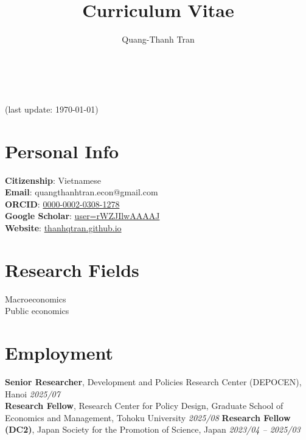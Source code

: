 \documentclass[12pt]{article}
\newcommand{\cvcolor}{\color{DodgerBlue4}} %
\renewcommand{\maketitle}{
\begin{center}
{\Huge\theauthor}\\
\vspace{0.5em}
{\Large \cvcolor{Curriculum Vitae}}\\
{\color{Gray}(last update: \today)}
\end{center}
}
\begin{document}
\title{Curriculum Vitae} %
\author{Quang-Thanh Tran}

\maketitle


\section{Personal Info}
\textbf{Citizenship}: Vietnamese \\
\textbf{Email}: quangthanhtran.econ@gmail.com \\
\textbf{ORCID}: \href{https://orcid.org/0000-0002-0308-1278}{0000-0002-0308-1278}\\
\textbf{Google Scholar}: \href{https://scholar.google.com/citations?user=rWZJIlwAAAAJ&hl=en}{user=rWZJIlwAAAAJ}\\
\textbf{Website}: \href{https://thanhqtran.github.io}{thanhqtran.github.io} \\


\section{Research Fields}
Macroeconomics \\
Public economics


\section{Employment}

\textbf{Senior Researcher}, Development and Policies Research Center (DEPOCEN), Hanoi \hfill \emph{2025/07} \\
\textbf{Research Fellow}, Research Center for Policy Design, Graduate School of Economics and Management, Tohoku University \hfill \emph{2025/08}
\textbf{Research Fellow (DC2)}, Japan Society for the Promotion of Science, Japan \hfill \emph{2023/04 -- 2025/03}
\end{document}
